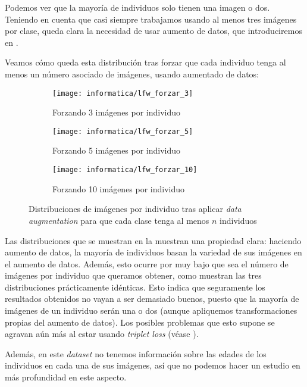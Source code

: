 Podemos ver que la mayoría de individuos solo tienen una imagen o dos. Teniendo en cuenta que casi siempre trabajamos usando al menos tres imágenes por clase, queda clara la necesidad de usar aumento de datos, que introduciremos en .

Veamos cómo queda esta distribución tras forzar que cada individuo tenga al menos un número asociado de imágenes, usando aumentado de datos:

\begin{figure}[h!]
\centering
    \begin{subfigure}{0.5\textwidth}
        \centering
        \texttt{[image: informatica/lfw\_forzar\_3]}
        \caption{Forzando 3 imágenes por individuo }
    \end{subfigure}%
    \begin{subfigure}{.5\textwidth}
        \centering
        \texttt{[image: informatica/lfw\_forzar\_5]}
        \caption{Forzando 5 imágenes por individuo}
    \end{subfigure}

    \begin{subfigure}{.5\textwidth}
        \centering
        \texttt{[image: informatica/lfw\_forzar\_10]}
        \caption{Forzando 10 imágenes por individuo }
    \end{subfigure}

    \caption{Distribuciones de imágenes por individuo tras aplicar \textit{data augmentation} para que cada clase tenga al menos $n$ individuos}
    \label{img:distribuciones_forzar_data_augmentation}
\end{figure}

Las distribuciones que se muestran en la  muestran una propiedad clara: haciendo aumento de datos, la mayoría de individuos basan la variedad de sus imágenes en el aumento de datos. Además, esto ocurre por muy bajo que sea el número de imágenes por individuo que queramos obtener, como muestran las tres distribuciones prácticamente idénticas. Esto indica que seguramente los resultados obtenidos no vayan a ser demasiado buenos, puesto que la mayoría de imágenes de un individuo serán una o dos  (aunque apliquemos transformaciones propias del aumento de datos). Los posibles problemas que esto supone se agravan aún más al estar usando \textit{triplet loss} (véase ).

Además, en este \textit{dataset} no tenemos información sobre las edades de los individuos en cada una de sus imágenes, así que no podemos hacer un estudio en más profundidad en este aspecto.

